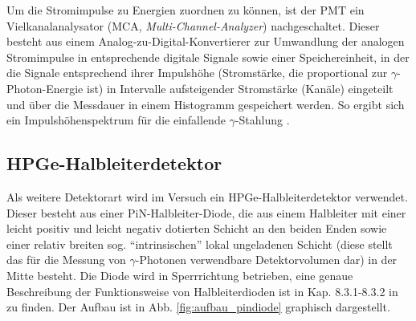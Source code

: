 
Um die Stromimpulse zu Energien zuordnen zu können, ist der PMT ein Vielkanalanalysator (MCA, \textit{Multi-Channel-Analyzer}) nachgeschaltet. Dieser besteht aus einem Analog-zu-Digital-Konvertierer zur Umwandlung der analogen Stromimpulse in entsprechende digitale Signale sowie einer Speichereinheit, in der die Signale entsprechend ihrer Impulshöhe (Stromstärke, die proportional zur $\gamma$-Photon-Energie ist) in Intervalle aufsteigender Stromstärke (Kanäle) eingeteilt und über die Messdauer in einem Histogramm gespeichert werden. So ergibt sich ein Impulshöhenspektrum für die einfallende $\gamma$-Stahlung \cite[291-292]{leotechniques}.

\subsection{HPGe-Halbleiterdetektor} \label{sec:ge_aufbau}

Als weitere Detektorart wird im Versuch ein HPGe-Halbleiterdetektor verwendet. Dieser besteht aus einer PiN-Halbleiter-Diode, die aus einem Halbleiter mit einer leicht positiv und leicht negativ dotierten Schicht an den beiden Enden sowie einer relativ breiten sog. \enquote{intrinsischen} lokal ungeladenen Schicht (diese stellt das für die Messung von $\gamma$-Photonen verwendbare Detektorvolumen dar) in der Mitte besteht. Die Diode wird in Sperrrichtung betrieben, eine genaue Beschreibung der Funktionsweise von Halbleiterdioden ist in Kap. 8.3.1-8.3.2 in \cite[288-300]{kolanoskiwermerdetektoren} zu finden. Der Aufbau ist in Abb. \ref{fig:aufbau_pindiode} graphisch dargestellt.


